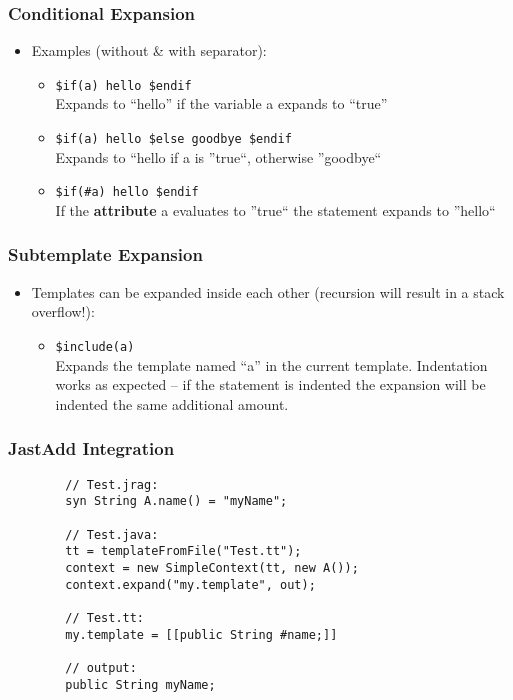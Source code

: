 \documentclass[a4paper,12pt,presentation]{beamer}
\begin{document}
\begin{frame}[fragile]
    \frametitle{Conditional Expansion}
    \begin{itemize}
        \item Examples (without \& with separator):
            \begin{itemize}
                \item \verb'$if(a) hello $endif' \\
                    Expands to ``hello'' if
                    the variable a expands to ``true''
                \item \verb'$if(a) hello $else goodbye $endif' \\
                    Expands to
                    ``hello if a is ''true``, otherwise ''goodbye``
                \item \verb'$if(#a) hello $endif' \\
                    If the {\bf attribute} a
                    evaluates to ''true`` the statement expands to ''hello``
            \end{itemize}
    \end{itemize}
\end{frame}

\begin{frame}[fragile]
    \frametitle{Subtemplate Expansion}
    \begin{itemize}
        \item Templates can be expanded inside each other (recursion will
            result in a stack overflow!):
            \begin{itemize}
                \item \verb'$include(a)' \\
                    Expands the template named ``a'' in the current template.
                    Indentation works as expected -- if the statement is
                    indented the expansion will be indented the same additional
                    amount.
            \end{itemize}
    \end{itemize}
\end{frame}

\begin{frame}[fragile]
    \frametitle{JastAdd Integration}

    \begin{verbatim}
        // Test.jrag:
        syn String A.name() = "myName";

        // Test.java:
        tt = templateFromFile("Test.tt");
        context = new SimpleContext(tt, new A());
        context.expand("my.template", out);

        // Test.tt:
        my.template = [[public String #name;]]

        // output:
        public String myName;
    \end{verbatim}
\end{frame}
\end{document}
